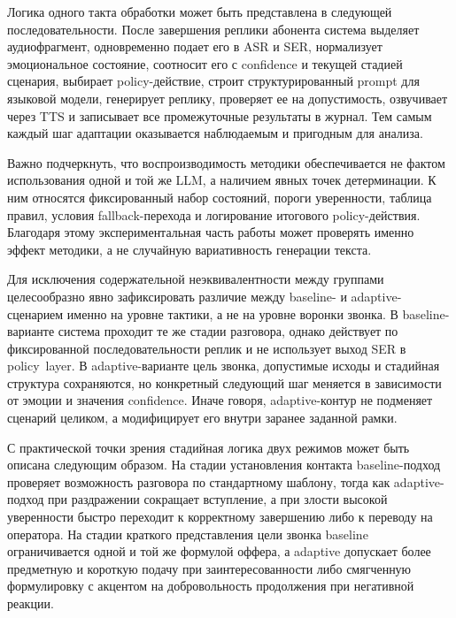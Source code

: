 \documentclass[a4paper,14pt]{extarticle}
\renewcommand{\texttt}[1]{\textnormal{#1}}
\begin{document}
Логика одного такта обработки может быть представлена в следующей
последовательности. После завершения реплики абонента система выделяет
аудиофрагмент, одновременно подает его в \texttt{ASR} и \texttt{SER},
нормализует эмоциональное состояние, соотносит его с \texttt{confidence}
и текущей стадией сценария, выбирает policy-действие, строит
структурированный prompt для языковой модели, генерирует реплику,
проверяет ее на допустимость, озвучивает через \texttt{TTS} и записывает
все промежуточные результаты в журнал. Тем самым каждый шаг адаптации
оказывается наблюдаемым и пригодным для анализа.

Важно подчеркнуть, что воспроизводимость методики обеспечивается не
фактом использования одной и той же LLM, а наличием явных точек
детерминации. К ним относятся фиксированный набор состояний, пороги
уверенности, таблица правил, условия fallback-перехода и логирование
итогового policy-действия. Благодаря этому экспериментальная часть
работы может проверять именно эффект методики, а не случайную
вариативность генерации текста.

Для исключения содержательной неэквивалентности между группами
целесообразно явно зафиксировать различие между baseline- и
adaptive-сценарием именно на уровне тактики, а не на уровне воронки
звонка. В baseline-варианте система проходит те же стадии разговора,
однако действует по фиксированной последовательности реплик и не
использует выход \texttt{SER} в \texttt{policy\ layer}. В
adaptive-варианте цель звонка, допустимые исходы и стадийная структура
сохраняются, но конкретный следующий шаг меняется в зависимости от
эмоции и значения \texttt{confidence}. Иначе говоря, adaptive-контур не
подменяет сценарий целиком, а модифицирует его внутри заранее заданной
рамки.

С практической точки зрения стадийная логика двух режимов может быть
описана следующим образом. На стадии установления контакта
baseline-подход проверяет возможность разговора по стандартному шаблону,
тогда как adaptive-подход при раздражении сокращает вступление, а при
злости высокой уверенности быстро переходит к корректному завершению
либо к переводу на оператора. На стадии краткого представления цели
звонка baseline ограничивается одной и той же формулой оффера, а
adaptive допускает более предметную и короткую подачу при
заинтересованности либо смягченную формулировку с акцентом на
добровольность продолжения при негативной реакции.
\end{document}

